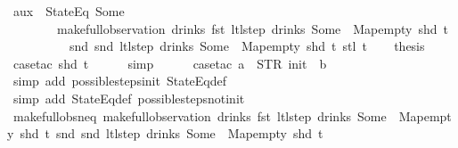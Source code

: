 \begin{isabellebody}
\isamarkupfalse%
\ aux{}{\isacharcolon}\ {\isachardoublequoteopen}{\isasymnot}\ StateEq\ {\isacharparenleft}Some\ {}{\isacharparenright}\isanewline
\ \ \ \ \ \ \ \ {\isacharparenleft}make{\isacharunderscore}full{\isacharunderscore}observation\ drinks\ {\isacharparenleft}fst\ {\isacharparenleft}ltl{\isacharunderscore}step\ drinks\ {\isacharparenleft}Some\ {}{\isacharparenright}\ Map{\isachardot}empty\ {\isacharparenleft}shd\ t{\isacharparenright}{\isacharparenright}{\isacharparenright}\isanewline
\ \ \ \ \ \ \ \ \ \ {\isacharparenleft}snd\ {\isacharparenleft}snd\ {\isacharparenleft}ltl{\isacharunderscore}step\ drinks\ {\isacharparenleft}Some\ {}{\isacharparenright}\ Map{\isachardot}empty\ {\isacharparenleft}shd\ t{\isacharparenright}{\isacharparenright}{\isacharparenright}{\isacharparenright}\ {\isacharparenleft}stl\ t{\isacharparenright}{\isacharparenright}{\isachardoublequoteclose}\isanewline
%
\isadelimproof
%
\endisadelimproof
%
\isatagproof
{}\isamarkupfalse%
{\isacharminus}\isanewline
\ \ \isamarkupfalse%
\ {\isacharquery}thesis\isanewline
\ \ \ \ \isamarkupfalse%
\ {\isacharparenleft}case{\isacharunderscore}tac\ {\isachardoublequoteopen}shd\ t{\isachardoublequoteclose}{\isacharparenright}\isanewline
\ \ \ \ \isamarkupfalse%
\ simp\isanewline
\ \ \ \ \isamarkupfalse%
\ {\isacharparenleft}case{\isacharunderscore}tac\ {\isachardoublequoteopen}a\ {\isacharequal}\ STR\ {\isacharprime}{\isacharprime}init{\isacharprime}{\isacharprime}\ {\isasymand}\ b\ {\isacharequal}\ {\isacharbrackleft}{\isacharbrackright}{\isachardoublequoteclose}{\isacharparenright}\isanewline
\ \ \ \ \ \isamarkupfalse%
\ {\isacharparenleft}simp\ add{\isacharcolon}\ possible{\isacharunderscore}steps{\isacharunderscore}init\ StateEq{\isacharunderscore}def{\isacharparenright}\isanewline
\ \ \ \ \isamarkupfalse%
\ {\isacharparenleft}simp\ add{\isacharcolon}\ StateEq{\isacharunderscore}def\ possible{\isacharunderscore}steps{\isacharunderscore}not{\isacharunderscore}init{\isacharparenright}\isanewline
{}\isamarkupfalse%
%
\endisatagproof
{\isafoldproof}%
%
\isadelimproof
\isanewline
%
\endisadelimproof
\isanewline
{}\isamarkupfalse%
\ make{\isacharunderscore}full{\isacharunderscore}obs{\isacharunderscore}neq{\isacharcolon}\ {\isachardoublequoteopen}make{\isacharunderscore}full{\isacharunderscore}observation\ drinks\ {\isacharparenleft}fst\ {\isacharparenleft}ltl{\isacharunderscore}step\ drinks\ {\isacharparenleft}Some\ {}{\isacharparenright}\ Map{\isachardot}empty\ {\isacharparenleft}shd\ t{\isacharparenright}{\isacharparenright}{\isacharparenright}\ {\isacharparenleft}snd\ {\isacharparenleft}snd\ {\isacharparenleft}ltl{\isacharunderscore}step\ drinks\ {\isacharparenleft}Some\ {}{\isacharparenright}\ Map{\isachardot}empty\ {\isacharparenleft}shd\ t{\isacharparenright}{\isacharparenright}{\isacharparenright}{\isacharparenright}\isanewline

\end{isabellebody}

